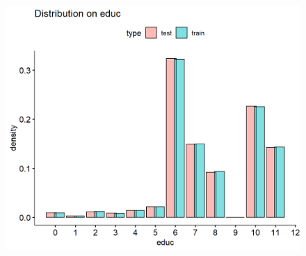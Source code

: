 \documentclass[11pt, letter,twocolumn]{article}
\begin{document}
\begin{figure}[ht]
	\centering

	\label{fig:unnamed-chunk-7-9}
	\includegraphics[width=0.9\linewidth]{imgs/preliminary_analysis/unnamed-chunk-7-9}
\end{figure}
 
\end{document}
